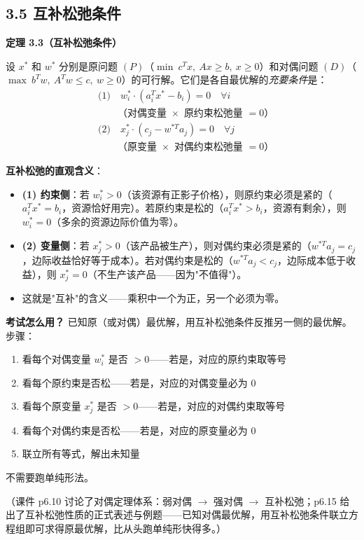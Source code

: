 \subsection{3.5 互补松弛条件}

\textbf{定理 3.3（互补松弛条件）}

设 $x^*$ 和 $w^*$ 分别是原问题 $(P)$（$\min\ c^T x,\ Ax\ge b,\ x\ge0$）和对偶问题 $(D)$（$\max\ b^T w,\ A^T w\le c,\ w\ge0$）的可行解。它们是各自最优解的\emph{充要条件}是：
\[
\begin{aligned}
&\text{(1)}\quad w_i^* \cdot (a_i^T x^* - b_i) = 0 \quad \forall i \\
&\qquad\text{（对偶变量 $\times$ 原约束松弛量 $=0$）}\\[4pt]
&\text{(2)}\quad x_j^* \cdot (c_j - w^{*T} a_j) = 0 \quad \forall j \\
&\qquad\text{（原变量 $\times$ 对偶约束松弛量 $=0$）}
\end{aligned}
\]

\medskip
\textbf{互补松弛的直观含义}：
\begin{itemize}
  \item \textbf{(1) 约束侧}：若 $w_i^* > 0$（该资源有正影子价格），则原约束必须是紧的（$a_i^T x^* = b_i$，资源恰好用完）。若原约束是松的（$a_i^T x^* > b_i$，资源有剩余），则 $w_i^* = 0$（多余的资源边际价值为零）。
  \item \textbf{(2) 变量侧}：若 $x_j^* > 0$（该产品被生产），则对偶约束必须是紧的（$w^{*T} a_j = c_j$，边际收益恰好等于成本）。若对偶约束是松的（$w^{*T} a_j < c_j$，边际成本低于收益），则 $x_j^* = 0$（不生产该产品——因为"不值得"）。
  \item 这就是"互补"的含义——乘积中一个为正，另一个必须为零。
\end{itemize}

\medskip
\textbf{考试怎么用？} 已知原（或对偶）最优解，用互补松弛条件反推另一侧的最优解。步骤：
\begin{enumerate}
  \item 看每个对偶变量 $w_i^*$ 是否 $>0$——若是，对应的原约束取等号
  \item 看每个原约束是否松——若是，对应的对偶变量必为 $0$
  \item 看每个原变量 $x_j^*$ 是否 $>0$——若是，对应的对偶约束取等号
  \item 看每个对偶约束是否松——若是，对应的原变量必为 $0$
  \item 联立所有等式，解出未知量
\end{enumerate}
不需要跑单纯形法。

（课件 p6.10 讨论了对偶定理体系：弱对偶 $\to$ 强对偶 $\to$ 互补松弛；p6.15 给出了互补松弛性质的正式表述与例题——已知对偶最优解，用互补松弛条件联立方程组即可求得原最优解，比从头跑单纯形快得多。）

